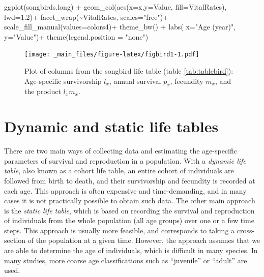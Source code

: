 \documentclass[
]{book}
\newenvironment{Shaded}{\begin{snugshade}}{\end{snugshade}}
\newcommand{\AttributeTok}[1]{\textcolor[rgb]{0.77,0.63,0.00}{#1}}
\newcommand{\FloatTok}[1]{\textcolor[rgb]{0.00,0.00,0.81}{#1}}
\newcommand{\FunctionTok}[1]{\textcolor[rgb]{0.00,0.00,0.00}{#1}}
\newcommand{\NormalTok}[1]{#1}
\newcommand{\SpecialCharTok}[1]{\textcolor[rgb]{0.00,0.00,0.00}{#1}}
\newcommand{\StringTok}[1]{\textcolor[rgb]{0.31,0.60,0.02}{#1}}
\begin{document}
\begin{Shaded}
\begin{Highlighting}[]
 \FunctionTok{ggplot}\NormalTok{(songbirds.long) }\SpecialCharTok{+} 
  \FunctionTok{geom\_col}\NormalTok{(}\FunctionTok{aes}\NormalTok{(}\AttributeTok{x=}\NormalTok{x,}\AttributeTok{y=}\NormalTok{Value, }\AttributeTok{fill=}\NormalTok{VitalRates), }\AttributeTok{lwd=}\FloatTok{1.2}\NormalTok{)}\SpecialCharTok{+}
  \FunctionTok{facet\_wrap}\NormalTok{(}\SpecialCharTok{\textasciitilde{}}\NormalTok{VitalRates, }\AttributeTok{scales=}\StringTok{"free"}\NormalTok{)}\SpecialCharTok{+}
  \FunctionTok{scale\_fill\_manual}\NormalTok{(}\AttributeTok{values=}\NormalTok{colors4)}\SpecialCharTok{+}
  \FunctionTok{theme\_bw}\NormalTok{() }\SpecialCharTok{+}
  \FunctionTok{labs}\NormalTok{( }\AttributeTok{x=}\StringTok{"Age (year)"}\NormalTok{, }\AttributeTok{y=}\StringTok{"Value"}\NormalTok{)}\SpecialCharTok{+}
   \FunctionTok{theme}\NormalTok{(}\AttributeTok{legend.position =} \StringTok{"none"}\NormalTok{) }
\end{Highlighting}
\end{Shaded}

\begin{figure}
\centering
\texttt{[image: \_main\_files/figure-latex/figbird1-1.pdf]}
\caption{\label{fig:figbird1}Plot of columns from the songbird life table (table \ref{tab:tablebird}): Age-specific survivorship \(l_x\), annual survival \(p_x\), fecundity \(m_x\), and the product \(l_xm_x\).}
\end{figure}

\hypertarget{dynamic-and-static-life-tables}{%
\section{Dynamic and static life tables}\label{dynamic-and-static-life-tables}}

There are two main ways of collecting data and estimating the age-specific parameters of survival and reproduction in a population. With a \emph{dynamic life table}, also known as a cohort life table, an entire cohort of individuals are followed from birth to death, and their survivorship and fecundity is recorded at each age. This approach is often expensive and time-demanding, and in many cases it is not practically possible to obtain such data. The other main approach is the \emph{static life table}, which is based on recording the survival and reproduction of individuals from the whole population (all age groups) over one or a few time steps. This approach is usually more feasible, and corresponds to taking a cross-section of the population at a given time. However, the approach assumes that we are able to determine the age of individuals, which is difficult in many species. In many studies, more coarse age classifications such as ``juvenile'' or ``adult'' are used.
\end{document}
